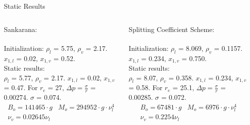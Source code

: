 \documentclass[8pt]{beamer}
\begin{document}
	\begin{frame}[t]{Static Results}

		\begin{columns}[t]
			Sankarana:\\~\\
			Initialization: $\rho_l$ = 5.75, $\rho_v$ = 2.17. ~\\
			$x_{1,l}$ = 0.02, $x_{1,v}$ = 0.52. ~\\

			Static results:\\
			$\rho_l$ = 5.77, $\rho_v$ = 2.17. $x_{1,l}$ = 0.02, $x_{1,v}$ = 0.47. For $r_e$ = 27, $\Delta p = \frac{\sigma}{r}$ = 0.00274. $\sigma$ = 0.074.
			\begin{equation*}
				\begin{split}
				B_o = 141 465 \cdot g \, \, \, \, \, M_o = 294 952 \cdot g \cdot \nu^4_l\\
				\nu_v = 0.02645 \nu_l 
				\end{split}
			\end{equation*}

			Splitting Coefficient Scheme:\\~\\
			Initialization: $\rho_l$ = 8.069, $\rho_v$ = 0.1157. ~\\
			$x_{1,l}$ = 0.234, $x_{1,v}$ = 0.750. ~\\

			Static results:\\
			$\rho_l$ = 8.07, $\rho_v$ = 0.358. $x_{1,l}$ = 0.234, $x_{1,v}$ = 0.58. For $r_e$ = 25.1, $\Delta p = \frac{\sigma}{r}$ = 0.00285. $\sigma$ = 0.072.
			\begin{equation*}
				\begin{split}
				B_o = 67 481 \cdot g \, \, \, \, \, M_o = 6976 \cdot g \cdot \nu^4_l\\
				\nu_v = 0.2254 \nu_l
				\end{split}
			\end{equation*}

		\end{columns}


\end{frame}
\end{document}
